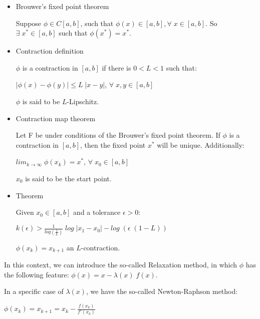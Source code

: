 \documentclass{article}
\begin{document}
\begin{itemize}

\item Brouwer's fixed point theorem

Suppose $\phi \in C[a,b]$, such that $\phi (x) \in [a,b], \forall \; x \in [a,b]$. So $\exists \; x^{*} \in [a,b]$ such that $\phi (x^{*}) = x^{*}$.

\item Contraction definition

$\phi$ is a contraction in $[a,b]$ if there is $0 < L < 1$ such that:

$| \phi (x) - \phi (y) | \leq L \; | x - y |$, $\forall \; x,y \in [a,b]$

$\phi$ is said to be $L$-Lipschitz.

\item Contraction map theorem

Let F be under conditions of the Brouwer's fixed point theorem. If $\phi$ is a contraction in $[a,b]$, then the fixed point $x^{*}$ will be unique. Additionally:

$lim_{k \rightarrow \infty} \; \phi (x_{k}) = x^{*}$, $\forall \; x_{0} \in [a,b]$

$x_{0}$ is said to be the start point.

\item Theorem

Given $x_{0} \in [a,b]$ and a tolerance $\epsilon > 0$:

$k(\epsilon) > \frac{1}{log (\frac{1}{L})} \; log \; | x_{1} - x_{0} | - log \; (\epsilon \; (1 - L))$

$\phi (x_{k}) = x_{k + 1}$ an $L$-contraction.

\end{itemize}

In this context, we can introduce the so-called Relaxation method, in which $\phi$ has the following feature: $\phi (x) = x - \lambda (x) \; f(x)$.

\hfill

In a specific case of $\lambda (x)$, we have the so-called Newton-Raphson method:

\hfill

$\phi (x_{k}) = x_{k + 1} = x_{k} - \frac{f(x_{k})}{f'(x_{k})}$
\end{document}
